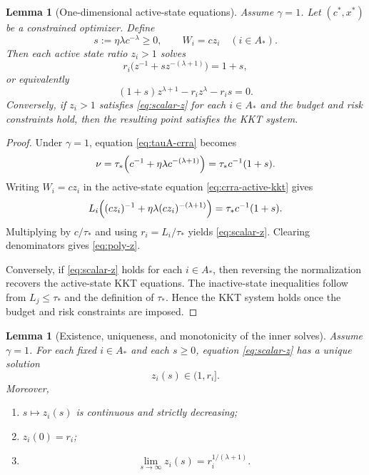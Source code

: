 \documentclass[11pt]{article}
\newtheorem{lemma}[theorem]{Lemma}
\theoremstyle{definition}
\theoremstyle{remark}
\newcommand{\1}{\mathbf{1}}
\begin{document}
\begin{lemma}[One-dimensional active-state equations]
\label{lem:activeeq}
Assume $\gamma=1$. Let $(c^*,x^*)$ be a constrained optimizer. Define
\[
s:=\eta\lambda c^{-\lambda}\ge 0,
\qquad
W_i=cz_i\quad (i\in A_*).
\]
Then each active state ratio $z_i>1$ solves
\begin{equation}
\label{eq:scalar-z}
r_i\bigl(z^{-1}+s z^{-(\lambda+1)}\bigr)=1+s,
\end{equation}
or equivalently
\begin{equation}
\label{eq:poly-z}
(1+s)z^{\lambda+1}-r_i z^\lambda-r_i s=0.
\end{equation}
Conversely, if $z_i>1$ satisfies \eqref{eq:scalar-z} for each $i\in A_*$ and the budget and risk constraints hold, then the resulting point satisfies the KKT system.
\end{lemma}

\begin{proof}
Under $\gamma=1$, equation \eqref{eq:tauA-crra} becomes
\[
\nu=\tau_*\Bigl(c^{-1}+\eta\lambda c^{-(\lambda+1)}\Bigr)=\tau_*c^{-1}(1+s).
\]
Writing $W_i=cz_i$ in the active-state equation \eqref{eq:crra-active-kkt} gives
\[
L_i\Bigl((cz_i)^{-1}+\eta\lambda(cz_i)^{-(\lambda+1)}\Bigr)=\tau_*c^{-1}(1+s).
\]
Multiplying by $c/\tau_*$ and using $r_i=L_i/\tau_*$ yields \eqref{eq:scalar-z}. Clearing denominators gives \eqref{eq:poly-z}.

Conversely, if \eqref{eq:scalar-z} holds for each $i\in A_*$, then reversing the normalization recovers the active-state KKT equations. The inactive-state inequalities follow from $L_j\le \tau_*$ and the definition of $\tau_*$. Hence the KKT system holds once the budget and risk constraints are imposed.
\end{proof}

\begin{lemma}[Existence, uniqueness, and monotonicity of the inner solves]
\label{lem:z-properties}
Assume $\gamma=1$. For each fixed $i\in A_*$ and each $s\ge 0$, equation \eqref{eq:scalar-z} has a unique solution
\[
z_i(s)\in (1,r_i].
\]
Moreover,
\begin{enumerate}[label=\textnormal{(\alph*)},leftmargin=*]
\item $s\mapsto z_i(s)$ is continuous and strictly decreasing;
\item $z_i(0)=r_i$;
\item
\[
\lim_{s\to\infty} z_i(s)=r_i^{1/(\lambda+1)}.
\]
\end{enumerate}
\end{lemma}
\end{document}
